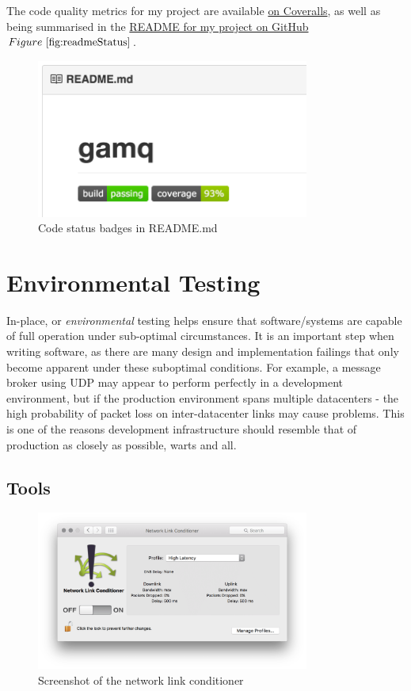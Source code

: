 The code quality metrics for my project are available
\href{https://coveralls.io/github/FireEater64/gamq?branch=master}{on Coveralls},
as well as being summarised in the
\href{https://github.com/FireEater64/gamq/blob/master/README.md}{README for my
project on GitHub}\(Figure~\ref{fig:readmeStatus} \).

\begin{figure}
  \includegraphics[width=0.8\textwidth]{figures/README}
  \centering
  \caption{Code status badges in README.md}
  \label{fig:readmeStatus}
\end{figure}

\section{Environmental Testing}
\label{sec:environmentalTesting}

In-place, or \emph{environmental} testing helps ensure that software/systems are
capable of full operation under sub-optimal circumstances. It is an important
step when writing software, as there are many design and implementation failings
that only become apparent under these suboptimal conditions. For example, a
message broker using UDP may appear to perform perfectly in a development
environment, but if the production environment spans multiple datacenters - the
high probability of packet loss on inter-datacenter links may cause problems.
This is one of the reasons development infrastructure should resemble that of
production as closely as possible, warts and all.

\subsection{Tools}
\label{sub:Tools}

\begin{figure}[htbp]
  \includegraphics[width=0.8\textwidth]{figures/networkLinkConditioner}
  \centering
  \caption{Screenshot of the network link conditioner}
  \label{fig:linkConditioner}
\end{figure}

